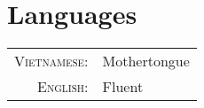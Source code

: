 \documentclass[a4paper,10pt]{article}
\begin{document}
\section{Languages}
\begin{tabular}{rl}
 \textsc{Vietnamese:}&Mothertongue\\
\textsc{English:}&Fluent\\
\end{tabular}
\end{document}
